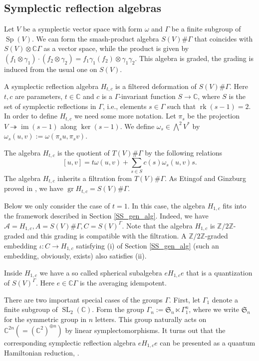 \documentclass[12pt]{amsart}
\newcommand{\A}{\mathcal{A}}
\newcommand{\Z}{\mathbb{Z}}
\newcommand{\C}{\mathbb{C}}
\theoremstyle{definition}
\begin{document}
\subsection{Symplectic reflection algebras}\label{SS_SRA}
Let $V$ be a symplectic vector space with form $\omega$ and $\Gamma$ be a finite subgroup of $\operatorname{Sp}(V)$.
We can form the smash-product algebra $S(V)\#\Gamma$ that coincides with
$S(V)\otimes \C\Gamma$ as a vector space, while the product is given by
$(f_1\otimes \gamma_1)\cdot (f_2\otimes \gamma_2)=f_1\gamma_1(f_2)\otimes \gamma_1\gamma_2$.
This algebra is graded, the grading is induced from the usual one on $S(V)$.

A symplectic reflection algebra $H_{t,c}$ is a filtered deformation of $S(V)\#\Gamma$.
Here $t,c$ are parameters, $t\in \C$ and $c$ is a $\Gamma$-invariant function
$S\rightarrow \C$, where $S$ is the set of symplectic reflections in $\Gamma$,
i.e., elements $s\in \Gamma$ such that $\operatorname{rk}(s-1)=2$.
In order to define $H_{t,c}$ we need some more notation. Let $\pi_s$ be the projection
$V\twoheadrightarrow \operatorname{im}(s-1)$ along $\ker(s-1)$. We define $\omega_s\in \bigwedge^2 V^*$
by $\omega_s(u,v):=\omega(\pi_s u,\pi_s v)$.

The algebra $H_{t,c}$ is the quotient of $T(V)\#\Gamma$ by the following relations
$$[u,v]=t\omega(u,v)+\sum_{s\in S}c(s)\omega_s(u,v)s.$$
The algebra $H_{t,c}$ inherits a filtration from $T(V)\#\Gamma$. As Etingof and Ginzburg
proved in \cite[Theorem 1.3]{EG}, we have $\operatorname{gr}H_{t,c}=S(V)\#\Gamma$.

Below we only consider the case of $t=1$. In this case, the algebra $H_{1,c}$ fits into
the framework described in Section \ref{SS_gen_alg}. Indeed, we have $\A= H_{1,c},
A=S(V)\#\Gamma, C=S(V)^\Gamma$.   Note that the algebra $H_{1,c}$ is $\Z/2\Z$-graded
and this grading is compatible with the filtration. A $\Z/2\Z$-graded embedding $\iota:C\rightarrow H_{1,c}$
satisfying (i) of Section \ref{SS_gen_alg} (such an embedding, obviously, exists) also satisfies (ii).

Inside $H_{1,c}$ we have a so called spherical subalgebra $eH_{1,c}e$ that is a quantization
of $S(V)^\Gamma$. Here $e\in \C\Gamma$ is the averaging idempotent.

There are two important special cases of the groups $\Gamma$. First, let $\Gamma_1$ denote
a finite subgroup of $\operatorname{SL}_2(\C)$. Form the group $\Gamma_n:=\mathfrak{S}_n\ltimes
\Gamma_1^n$, where we write $\mathfrak{S}_n$ for the symmetric group in $n$ letters.
This group naturally acts on $\C^{2n}(=(\C^2)^{\oplus n})$ by linear symplectomorphisms.
It turns out that the corresponding symplectic reflection algebra $eH_{1,c}e$ can be
presented as a quantum Hamiltonian reduction, \cite{EGGO,quant}.
\end{document}
